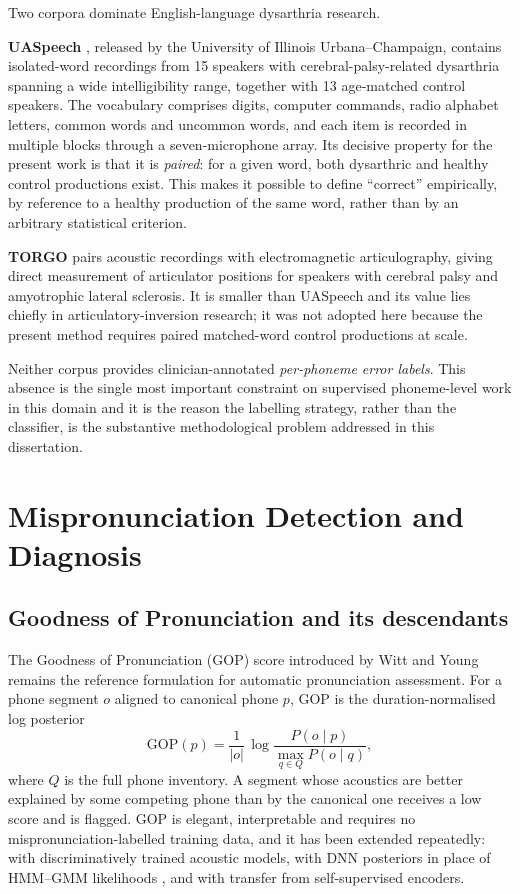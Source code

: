 Two corpora dominate English-language dysarthria research.

\textbf{UASpeech} \cite{kim2008dysarthric}, released by the University of
Illinois Urbana--Champaign, contains isolated-word recordings from 15 speakers
with cerebral-palsy-related dysarthria spanning a wide intelligibility range,
together with 13 age-matched control speakers. The vocabulary comprises digits,
computer commands, radio alphabet letters, common words and uncommon words, and
each item is recorded in multiple blocks through a seven-microphone array. Its
decisive property for the present work is that it is \emph{paired}: for a given
word, both dysarthric and healthy control productions exist. This makes it
possible to define ``correct'' empirically, by reference to a healthy
production of the same word, rather than by an arbitrary statistical criterion.

\textbf{TORGO} \cite{rudzicz2012torgo} pairs acoustic recordings with
electromagnetic articulography, giving direct measurement of articulator
positions for speakers with cerebral palsy and amyotrophic lateral sclerosis.
It is smaller than UASpeech and its value lies chiefly in articulatory-inversion
research; it was not adopted here because the present method requires paired
matched-word control productions at scale.

Neither corpus provides clinician-annotated \emph{per-phoneme error labels}.
This absence is the single most important constraint on supervised
phoneme-level work in this domain and it is the reason the labelling strategy,
rather than the classifier, is the substantive methodological problem addressed
in this dissertation.

\section{Mispronunciation Detection and Diagnosis}
\label{sec:lit-mdd}

\subsection{Goodness of Pronunciation and its descendants}

The Goodness of Pronunciation (GOP) score introduced by Witt and Young
\cite{witt2000phone} remains the reference formulation for automatic
pronunciation assessment. For a phone segment $o$ aligned to canonical phone
$p$, GOP is the duration-normalised log posterior
\begin{equation}
\mathrm{GOP}(p) = \frac{1}{|o|}\,
\log \frac{P(o \mid p)}{\max_{q \in Q} P(o \mid q)},
\label{eq:gop}
\end{equation}
where $Q$ is the full phone inventory. A segment whose acoustics are better
explained by some competing phone than by the canonical one receives a low
score and is flagged. GOP is elegant, interpretable and requires no
mispronunciation-labelled training data, and it has been extended repeatedly:
with discriminatively trained acoustic models, with DNN posteriors in place of
HMM--GMM likelihoods \cite{hu2015improved}, and with transfer from
self-supervised encoders.

